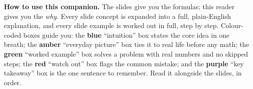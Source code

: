 \noindent\textbf{How to use this companion.}
The slides give you the formulas; this reader gives you the \emph{why}. Every
slide concept is expanded into a full, plain-English explanation, and every
slide example is worked out in full, step by step. Colour-coded boxes guide you:
the \textcolor{intuFrame}{\textbf{blue}} ``intuition'' box states the core idea
in one breath; the \textcolor{everyFrame}{\textbf{amber}} ``everyday picture''
box ties it to real life before any math; the \textcolor{workFrame}{\textbf{green}}
``worked example'' box solves a problem with real numbers and no skipped steps;
the \textcolor{watchFrame}{\textbf{red}} ``watch out'' box flags the common
mistake; and the \textcolor{keyFrame}{\textbf{purple}} ``key takeaway'' box is
the one sentence to remember. Read it alongside the slides, in order.

\medskip

%
%

